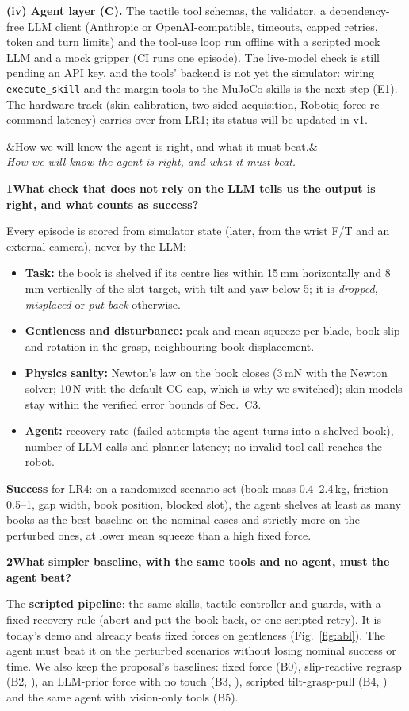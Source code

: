 \documentclass[10pt]{article}
\newcommand{\code}[1]{\texttt{\small #1}}
\newcommand{\tplsec}[3]{\par\vspace{7pt}\noindent\colorbox{tplband}{\parbox{\dimexpr\linewidth-2\fboxsep}{%
  \vspace{2pt}{\color{tplorange}\large\bfseries #1}\hspace{0.5em}{\large\bfseries #2}%
  \ifx&#3&\else\\[-1pt]{\small\itshape\color{ink2}#3}\fi\vspace{2pt}}}\par\vspace{3pt}}
\newcommand{\tplq}[2]{\par\vspace{3pt}\noindent\colorbox{tplrow}{\parbox{\dimexpr\linewidth-2\fboxsep}{%
  {\color{tplorange}\bfseries #1}\hspace{0.45em}\textbf{#2}}}\par\vspace{1pt}}
\begin{document}
\textbf{(iv) Agent layer (C).} The tactile tool schemas, the validator, a dependency-free LLM client (Anthropic or
OpenAI-compatible, timeouts, capped retries, token and turn limits) and the tool-use loop run offline with a scripted
mock LLM and a mock gripper (CI runs one episode). The live-model check is still pending an API key, and the tools'
backend is not yet the simulator: wiring \code{execute\_skill} and the margin tools to the MuJoCo skills is the next
step (E1). The hardware track (skin calibration, two-sided acquisition, Robotiq force re-command latency) carries over
from LR1; its status will be updated in v1.

\FloatBarrier
\tplsec{D}{Evaluation}{How we will know the agent is right, and what it must beat.}
\tplq{1}{What check that does not rely on the LLM tells us the output is right, and what counts as success?}
Every episode is scored from simulator state (later, from the wrist F/T and an external camera), never by the LLM:
\begin{itemize}
\item \textbf{Task:} the book is shelved if its centre lies within 15\,mm horizontally and 8\,mm vertically of the slot
target, with tilt and yaw below 5\textdegree; it is \emph{dropped}, \emph{misplaced} or \emph{put back} otherwise.
\item \textbf{Gentleness and disturbance:} peak and mean squeeze per blade, book slip and rotation in the grasp,
neighbouring-book displacement.
\item \textbf{Physics sanity:} Newton's law on the book closes (3\,mN with the Newton solver; 10\,N with the default CG
cap, which is why we switched); skin models stay within the verified error bounds of Sec.~C3.
\item \textbf{Agent:} recovery rate (failed attempts the agent turns into a shelved book), number of LLM calls and
planner latency; no invalid tool call reaches the robot.
\end{itemize}
\textbf{Success} for LR4: on a randomized scenario set (book mass 0.4--2.4\,kg, friction 0.5--1, gap width, book
position, blocked slot), the agent shelves at least as many books as the best baseline on the nominal cases and
strictly more on the perturbed ones, at lower mean squeeze than a high fixed force.

\tplq{2}{What simpler baseline, with the same tools and no agent, must the agent beat?}
The \textbf{scripted pipeline}: the same skills, tactile controller and guards, with a fixed recovery rule (abort and
put the book back, or one scripted retry). It is today's demo and already beats fixed forces on gentleness
(Fig.~\ref{fig:abl}). The agent must beat it on the perturbed scenarios without losing nominal success or time. We also
keep the proposal's baselines: fixed force (B0), slip-reactive regrasp (B2, \cite{dong2017}), an LLM-prior force with
no touch (B3, \cite{xie2024deligrasp}), scripted tilt-grasp-pull (B4, \cite{wieczorek2022trixi}) and the same agent with
vision-only tools (B5).
\end{document}

